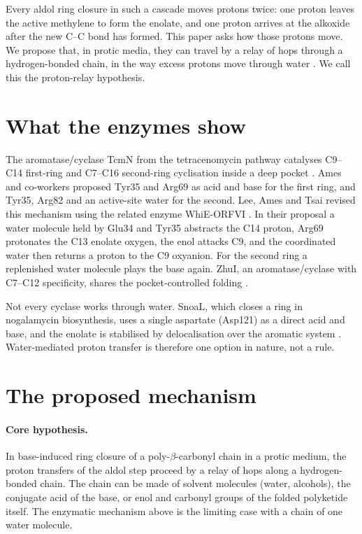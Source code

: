 \documentclass[11pt]{article}
\begin{document}
Every aldol ring closure in such a cascade moves protons twice: one proton leaves the active methylene to form the enolate, and one proton arrives at the alkoxide after the new C--C bond has formed. This paper asks how those protons move. We propose that, in protic media, they can travel by a relay of hops through a hydrogen-bonded chain, in the way excess protons move through water \cite{agmon1995,marx1999}. We call this the proton-relay hypothesis.

\section{What the enzymes show}
The aromatase/cyclase TcmN from the tetracenomycin pathway catalyses C9--C14 first-ring and C7--C16 second-ring cyclisation inside a deep pocket \cite{ames2008}. Ames and co-workers proposed Tyr35 and Arg69 as acid and base for the first ring, and Tyr35, Arg82 and an active-site water for the second. Lee, Ames and Tsai revised this mechanism using the related enzyme WhiE-ORFVI \cite{lee2012}. In their proposal a water molecule held by Glu34 and Tyr35 abstracts the C14 proton, Arg69 protonates the C13 enolate oxygen, the enol attacks C9, and the coordinated water then returns a proton to the C9 oxyanion. For the second ring a replenished water molecule plays the base again. ZhuI, an aromatase/cyclase with C7--C12 specificity, shares the pocket-controlled folding \cite{ames2011}.

Not every cyclase works through water. SnoaL, which closes a ring in nogalamycin biosynthesis, uses a single aspartate (Asp121) as a direct acid and base, and the enolate is stabilised by delocalisation over the aromatic system \cite{sultana2004}. Water-mediated proton transfer is therefore one option in nature, not a rule.

\section{The proposed mechanism}
\paragraph{Core hypothesis.} In base-induced ring closure of a poly-$\beta$-carbonyl chain in a protic medium, the proton transfers of the aldol step proceed by a relay of hops along a hydrogen-bonded chain. The chain can be made of solvent molecules (water, alcohols), the conjugate acid of the base, or enol and carbonyl groups of the folded polyketide itself. The enzymatic mechanism above is the limiting case with a chain of one water molecule.
\end{document}
